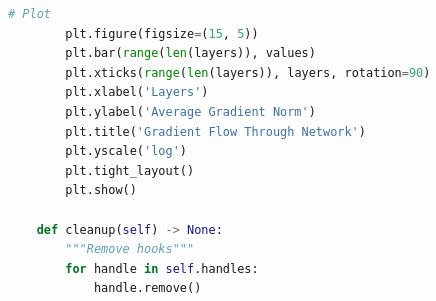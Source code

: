 \begin{lstlisting}[language=Python, caption=Attention Visualization Tools]
        # Plot
        plt.figure(figsize=(15, 5))
        plt.bar(range(len(layers)), values)
        plt.xticks(range(len(layers)), layers, rotation=90)
        plt.xlabel('Layers')
        plt.ylabel('Average Gradient Norm')
        plt.title('Gradient Flow Through Network')
        plt.yscale('log')
        plt.tight_layout()
        plt.show()

    def cleanup(self) -> None:
        """Remove hooks"""
        for handle in self.handles:
            handle.remove()
\end{lstlisting}
